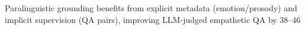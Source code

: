 Paralinguistic grounding benefits from explicit metadata (emotion/prosody) and implicit supervision (QA pairs), improving LLM‑judged empathetic QA by 38–46%

